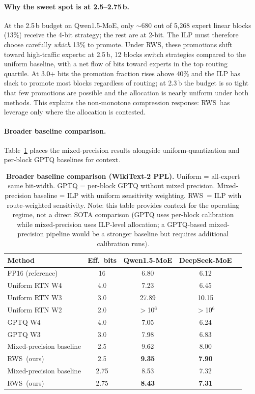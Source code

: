 \documentclass{article}
\newcommand{\method}{\textsc{RWS}\xspace}
\begin{document}
\paragraph{Why the sweet spot is at 2.5--2.75\,b.} At the 2.5\,b budget on Qwen1.5-MoE, only $\sim$680 out of 5,268 expert linear blocks (13\%) receive the 4-bit strategy; the rest are at 2-bit. The ILP must therefore choose carefully \emph{which} 13\% to promote. Under \method, these promotions shift toward high-traffic experts: at 2.5\,b, 12 blocks switch strategies compared to the uniform baseline, with a net flow of bits toward experts in the top routing quartile. At 3.0+ bits the promotion fraction rises above 40\% and the ILP has slack to promote most blocks regardless of routing; at 2.3\,b the budget is so tight that few promotions are possible and the allocation is nearly uniform under both methods. This explains the non-monotone compression response: \method\ has leverage only where the allocation is contested.

\paragraph{Broader baseline comparison.} Table~\ref{tab:broad} places the mixed-precision results alongside uniform-quantization and per-block GPTQ baselines for context.

\begin{table}[ht]
\centering
\small
\caption{\textbf{Broader baseline comparison (WikiText-2 PPL).} Uniform = all-expert same bit-width. GPTQ = per-block GPTQ without mixed precision. Mixed-precision baseline = ILP with uniform sensitivity weighting. \method\ = ILP with route-weighted sensitivity. Note: this table provides context for the operating regime, not a direct SOTA comparison (GPTQ uses per-block calibration while mixed-precision uses ILP-level allocation; a GPTQ-based mixed-precision pipeline would be a stronger baseline but requires additional calibration runs).}
\label{tab:broad}
\begin{tabular}{lcccc}
\toprule
Method & Eff.\ bits & Qwen1.5-MoE & DeepSeek-MoE \\
\midrule
FP16 (reference) & 16 & 6.80 & 6.12 \\
\midrule
Uniform RTN W4 & 4.0 & 7.23 & 6.45 \\
Uniform RTN W3 & 3.0 & 27.89 & 10.15 \\
Uniform RTN W2 & 2.0 & $>$10$^6$ & $>$10$^6$ \\
GPTQ W4 & 4.0 & 7.05 & 6.24 \\
GPTQ W3 & 3.0 & 7.98 & 6.83 \\
\midrule
Mixed-precision baseline & 2.5 & 9.62 & 8.00 \\
\method\ (ours) & 2.5 & \textbf{9.35} & \textbf{7.90} \\
Mixed-precision baseline & 2.75 & 8.53 & 7.32 \\
\method\ (ours) & 2.75 & \textbf{8.43} & \textbf{7.31} \\
\bottomrule
\end{tabular}
\end{table}
\end{document}

